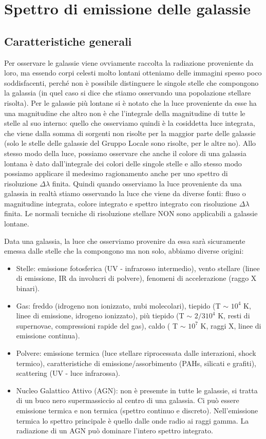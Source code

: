 \section{Spettro di emissione delle galassie}
\subsection{Caratteristiche generali}
Per osservare le galassie viene ovviamente raccolta la radiazione proveniente da loro, ma essendo corpi celesti molto lontani otteniamo delle immagini spesso poco soddisfacenti, perché non è possibile distinguere le singole stelle che compongono la galassia (in quel caso si dice che stiamo osservando una popolazione stellare risolta). Per le galassie più lontane si è notato che la luce proveniente da esse ha una magnitudine che altro non è che l'integrale della magnitudine di tutte le stelle al suo interno: quello che osserviamo quindi è la cosiddetta luce integrata, che viene dalla somma di sorgenti non risolte per la maggior parte delle galassie (solo le stelle delle galassie del Gruppo Locale sono risolte, per le altre no). Allo stesso modo della luce, possiamo osservare che anche il colore di una galassia lontana è dato dall'integrale dei colori delle singole stelle e allo stesso modo possiamo applicare il medesimo ragionamento anche per uno spettro di risoluzione $\Delta\lambda$ finita. Quindi quando osserviamo la luce proveniente da una galassia in realtà stiamo osservando la luce che viene da diverse fonti: fluso o magnitudine integrata, colore integrato e spettro integrato con risoluzione $\Delta\lambda$ finita. Le normali tecniche di risoluzione stellare NON sono applicabili a galassie lontane.

Data una galassia, la luce che osserviamo provenire da essa sarà sicuramente emessa dalle stelle che la compongono ma non solo, abbiamo diverse origini:
\begin{itemize}
    \item Stelle: emissione fotosferica (UV - infrarosso intermedio), vento stellare (linee di emissione, IR da involucri di polvere), fenomeni di accelerazione (raggo X binari).
    \item Gas: freddo (idrogeno non ionizzato, nubi molecolari), tiepido (T $\sim$ $10^4$ K, linee di emissione, idrogeno ionizzato), più tiepido (T $\sim$ $2/3 10^4$ K, resti di supernovae, compressioni rapide del gas), caldo ( T $\sim$ $10^7$ K, raggi X, linee di emissione continua).
    \item Polvere: emissione termica (luce stellare riprocessata dalle interazioni, shock termico), caratteristiche di emissione/assorbimento (PAHs, silicati e grafiti), scattering (UV - luce infrarossa).
    \item Nucleo Galattico Attivo (AGN): non è presemte in tutte le galassie, si tratta di un buco nero supermassiccio al centro di una galassia. Ci può essere emissione termica e non termica (spettro continuo e discreto). Nell'emissione termica lo spettro principale è quello dalle onde radio ai raggi gamma. La radiazione di un AGN può dominare l'intero spettro integrato.
\end{itemize}

